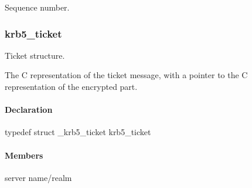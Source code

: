 \documentclass[letterpaper,10pt,english]{sphinxmanual}
\begin{document}

\begin{fulllineitems}
\label{appdev/refs/types/krb5_replay_data:krb5_replay_data.seq}
Sequence number.

\end{fulllineitems}



\subsubsection{krb5\_ticket}
\label{appdev/refs/types/krb5_ticket:krb5-ticket}\label{appdev/refs/types/krb5_ticket::doc}\label{appdev/refs/types/krb5_ticket:krb5-ticket-struct}

\begin{fulllineitems}
\label{appdev/refs/types/krb5_ticket:krb5_ticket}
\end{fulllineitems}


Ticket structure.

The C representation of the ticket message, with a pointer to the C representation of the encrypted part.


\paragraph{Declaration}
\label{appdev/refs/types/krb5_ticket:declaration}
typedef struct \_krb5\_ticket  krb5\_ticket


\paragraph{Members}
\label{appdev/refs/types/krb5_ticket:members}

\begin{fulllineitems}
\label{appdev/refs/types/krb5_ticket:krb5_ticket.magic}
\end{fulllineitems}


\begin{fulllineitems}
\label{appdev/refs/types/krb5_ticket:krb5_ticket.server}
server name/realm

\end{fulllineitems}
\end{document}
